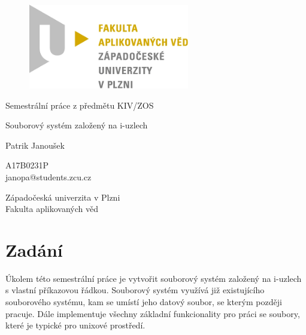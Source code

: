 \documentclass[12pt, a4paper]{article}
\begin{document}
    \begin{titlepage}

        \centering

        \vspace*{\baselineskip}

        \begin{figure}[H]
            \centering
            \includegraphics[width=7cm]{fav-logo.png}
        \end{figure}

        \vspace*{1\baselineskip}
        {\sc Semestrální práce z předmětu KIV/ZOS}
        \vspace*{1\baselineskip}

        \vspace{0.75\baselineskip}

        {\LARGE\sc Souborový systém založený na i-uzlech \\}

        \vspace{4\baselineskip}

        {\sc\Large Patrik Janoušek \\}

        \vspace{0.5\baselineskip}

        {A17B0231P}\\
        {janopa@students.zcu.cz}

        \vfill

        {\sc Západočeská univerzita v Plzni\\
        Fakulta aplikovaných věd}


    \end{titlepage}


    \tableofcontents
    \pagebreak

    \newpage

    \section{Zadání}
    Úkolem této semestrální práce je vytvořit souborový systém založený na i-uzlech s vlastní příkazovou řádkou.
    Souborový systém využívá již existujícího souborového systému, kam se umístí jeho datový soubor, se kterým později pracuje.
    Dále implementuje všechny základní funkcionality pro práci se soubory, které je typické pro unixové prostředí.
\end{document}
